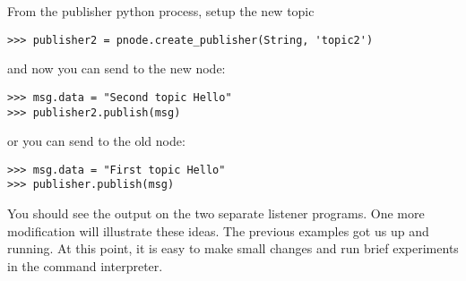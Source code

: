 \begin{Shaded}
\begin{Highlighting}[]
\OperatorTok{=}\NormalTok{)}
\OperatorTok{=}\NormalTok{)}
 \OperatorTok{\%}

\OperatorTok{=}
\OperatorTok{\textgreater{}\textgreater{}\textgreater{}} 







\end{Highlighting}
\end{Shaded}

From the publisher python process, setup the new topic

\begin{verbatim}
>>> publisher2 = pnode.create_publisher(String, 'topic2')
\end{verbatim}

and now you can send to the new node:

\begin{verbatim}
>>> msg.data = "Second topic Hello"
>>> publisher2.publish(msg)
\end{verbatim}

or you can send to the old node:

\begin{verbatim}
>>> msg.data = "First topic Hello"
>>> publisher.publish(msg)
\end{verbatim}

You should see the output on the two separate listener programs. One
more modification will illustrate these ideas. The previous examples got
us up and running. At this point, it is easy to make small changes and
run brief experiments in the command interpreter.

